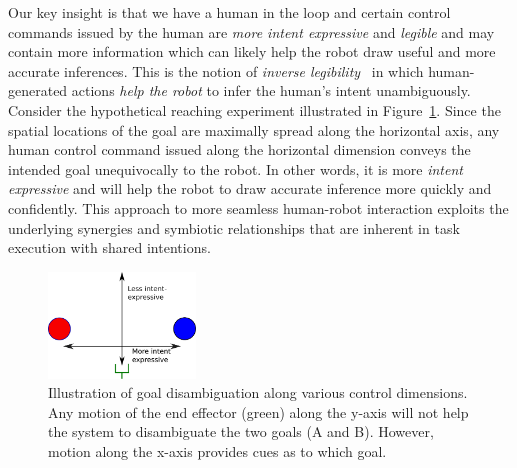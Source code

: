 Our key insight is that we have a human in the loop and certain control commands issued by the human are \textit{more intent expressive} and \textit{legible} and may contain more information which can likely help the robot draw useful and more accurate inferences. This is the notion of \textit{inverse legibility}~\cite{gopinath2017mode} in which human-generated actions \textit{help the robot} to infer the human's intent unambiguously. Consider the hypothetical reaching experiment illustrated in Figure~\ref{fig:disamb}. Since the spatial locations of the goal are maximally spread along the horizontal axis, any human control command issued along the horizontal dimension conveys the intended goal unequivocally to the robot. In other words, it is more \textit{intent expressive} and will help the robot to draw accurate inference more quickly and confidently. This approach to more seamless human-robot interaction exploits the underlying synergies and symbiotic relationships that are inherent in task execution with shared intentions. 
\begin{figure}
	\begin{center}
		\includegraphics[width=0.35\textwidth]{./figures/Fig1_Disamb.eps}
	\end{center}
	\caption{Illustration of goal disambiguation along various control dimensions. Any motion of the end effector (green) along the y-axis will not help the system to disambiguate the two goals (A and B). However, motion along the x-axis provides cues as to which goal.}
	\label{fig:disamb}
\end{figure}

